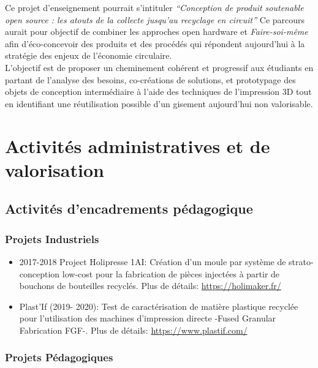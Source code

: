 \documentclass[
  11pt,
]{article}
\begin{document}
Ce projet d'enseignement pourrait s'intituler \emph{``Conception de
produit soutenable open source : les atouts de la collecte jusqu'au
recyclage en circuit''} Ce parcours aurait pour objectif de combiner les
approches open hardware et \emph{Faire-soi-même} afin d'éco-concevoir
des produits et des procédés qui répondent aujourd'hui à la stratégie
des enjeux de l'économie circulaire.\\
L'objectif est de proposer un cheminement cohérent et progressif aux
étudiants en partant de l'analyse des besoins, co-créations de
solutions, et prototypage des objets de conception intermédiaire à
l'aide des techniques de l'impression 3D tout en identifiant une
réutilisation possible d'un gisement aujourd'hui non valorisable.

\hypertarget{activituxe9s-administratives-et-de-valorisation}{%
\section{Activités administratives et de
valorisation}\label{activituxe9s-administratives-et-de-valorisation}}

\hypertarget{activituxe9s-dencadrements-puxe9dagogique}{%
\subsection{Activités d'encadrements
pédagogique}\label{activituxe9s-dencadrements-puxe9dagogique}}

\hypertarget{projets-industriels}{%
\subsubsection{Projets Industriels}\label{projets-industriels}}

\begin{itemize}
\item
  2017-2018 Project Holipresse 1AI: Création d'un moule par système de
  strato-conception low-cost pour la fabrication de pièces injectées à
  partir de bouchons de bouteilles recyclés. Plus de détails:
  \url{https://holimaker.fr/}
\item
  Plast'If (2019- 2020): Test de caractérisation de matière plastique
  recyclée pour l'utilisation des machines d'impression directe -Fused
  Granular Fabrication FGF-. Plus de détails:
  \url{https://www.plastif.com/}
\end{itemize}

\hypertarget{projets-puxe9dagogiques}{%
\subsubsection{Projets Pédagogiques}\label{projets-puxe9dagogiques}}
\end{document}
